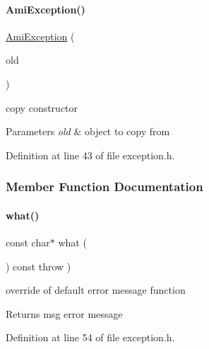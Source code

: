 \paragraph{\texorpdfstring{Ami\+Exception()}{AmiException()}\hspace{0.1cm}{\footnotesize\ttfamily [2/2]}}
{\footnotesize\ttfamily \mbox{\hyperlink{classamici_1_1_ami_exception}{Ami\+Exception}} (\begin{DoxyParamCaption}\item[{const \mbox{\hyperlink{classamici_1_1_ami_exception}{Ami\+Exception}} \&}]{old }\end{DoxyParamCaption})}

copy constructor 
\begin{DoxyParams}{Parameters}
{\em old} & object to copy from\\
\hline
\end{DoxyParams}


Definition at line 43 of file exception.\+h.



\subsubsection{Member Function Documentation}
\mbox{\label{classamici_1_1_ami_exception_a79009ed133fa02b942ddce8f0b987f3e}} 
\paragraph{\texorpdfstring{what()}{what()}}
{\footnotesize\ttfamily const char$\ast$ what (\begin{DoxyParamCaption}{ }\end{DoxyParamCaption}) const throw  ) }

override of default error message function \begin{DoxyReturn}{Returns}
msg error message 
\end{DoxyReturn}


Definition at line 54 of file exception.\+h.

